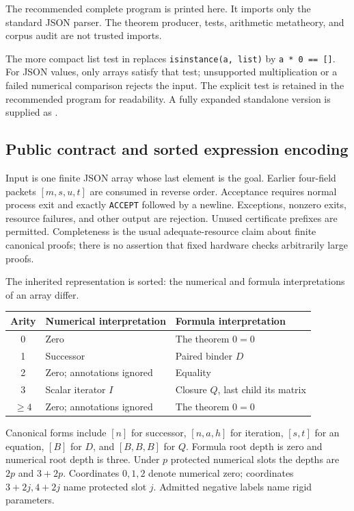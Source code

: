 The recommended complete program is printed here. It imports only the
standard JSON parser. The theorem producer, tests, arithmetic metatheory,
and corpus audit are not trusted imports.

The more compact list test in  replaces
\texttt{isinstance(a, list)} by \texttt{a * 0 == []}. For JSON values,
only arrays satisfy that test; unsupported multiplication or a failed
numerical comparison rejects the input. The explicit test is retained
in the recommended program for readability. A fully expanded standalone
version is supplied as .

\subsection{Public contract and sorted expression encoding}
Input is one finite JSON array whose last element is the goal. Earlier
four-field packets $[m,s,u,t]$ are consumed in reverse order. Acceptance
requires normal process exit and exactly \texttt{ACCEPT} followed by a
newline. Exceptions, nonzero exits, resource failures, and other output
are rejection. Unused certificate prefixes are permitted. Completeness
is the usual adequate-resource claim about finite canonical proofs;
there is no assertion that fixed hardware checks arbitrarily large proofs.

The inherited representation is sorted: the numerical and formula
interpretations of an array differ.
\begin{center}\small
\begin{tabularx}{\linewidth}{@{}cXX@{}}
\toprule
Arity & Numerical interpretation & Formula interpretation\\\midrule
0 & Zero & The theorem $0=0$\\
1 & Successor & Paired binder $D$\\
2 & Zero; annotations ignored & Equality\\
3 & Scalar iterator $I$ & Closure $Q$, last child its matrix\\
$\ge4$ & Zero; annotations ignored & The theorem $0=0$\\
\bottomrule
\end{tabularx}
\end{center}
Canonical forms include $[n]$ for successor, $[n,a,h]$ for iteration,
$[s,t]$ for an equation, $[B]$ for $D$, and $[B,B,B]$ for $Q$.
Formula root depth is zero and numerical root depth is three. Under
$p$ protected numerical slots the depths are $2p$ and $3+2p$.
Coordinates $0,1,2$ denote numerical zero; coordinates $3+2j,4+2j$
name protected slot $j$. Admitted negative labels name rigid parameters.

